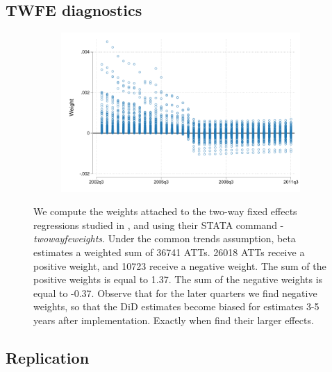 \subsection{TWFE diagnostics}
\begin{figure}[H]
     \caption{TWFE weights}
    \label{twfe_weights}
\begin{center}
       \begin{subfigure}{0.45\textwidth}
        \includegraphics[width=\textwidth]{Figuras/twfe_w_p_t.pdf}
    \end{subfigure}
  \end{center}
    \scriptsize 
We compute the weights attached to the two-way fixed effects regressions studied in \cite{deChaisemartin_twfe_weight}, and using their STATA command - \textit{twowayfeweights}. Under the common trends assumption, beta estimates a weighted sum of 36741 ATTs. 26018 ATTs receive a positive weight, and 10723 receive a negative weight.
The sum of the positive weights is equal to 1.37.
The sum of the negative weights is equal to -0.37.
Observe that for the later quarters we find negative weights, so that the DiD estimates become biased for estimates 3-5 years after implementation. Exactly when \cite{Campos} find their larger effects.
\end{figure}


\subsection{Replication \cite{Campos}}

